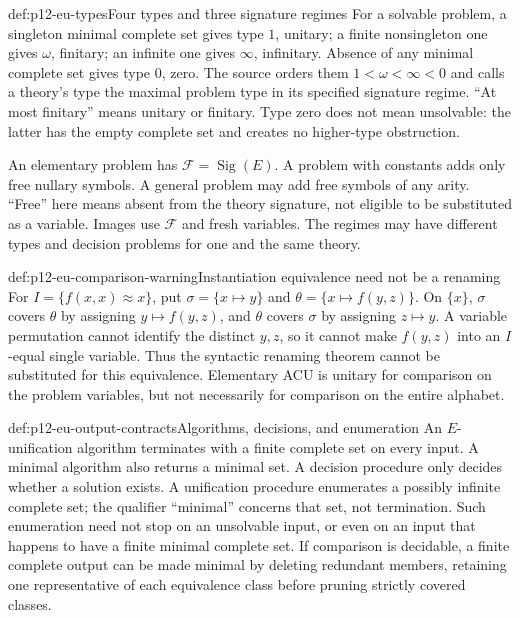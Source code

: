 \begin{hbdefinition}{def:p12-eu-types}{Four types and three signature regimes}
For a solvable problem, a singleton minimal complete set gives type
\(1\), unitary; a finite nonsingleton one gives \(\omega\), finitary;
an infinite one gives \(\infty\), infinitary. Absence of any minimal
complete set gives type \(0\), zero. The source orders them
\(1<\omega<\infty<0\) and calls a theory's type the maximal problem
type in its specified signature regime. ``At most finitary'' means
unitary or finitary. Type zero does not mean unsolvable: the latter
has the empty complete set and creates no higher-type obstruction.

An elementary problem has \(\mathcal F=\operatorname{Sig}(E)\).
A problem with constants adds only free nullary symbols. A general
problem may add free symbols of any arity. ``Free'' here means absent
from the theory signature, not eligible to be substituted as a variable.
Images use \(\mathcal F\) and fresh variables. The regimes may have
different types and decision problems for one and the same theory.
\cite[Definitions 3.4 and 3.9, pp.~471 and 474]{BaaderSnyder2001}
\end{hbdefinition}

\begin{hbexample}{def:p12-eu-comparison-warning}{Instantiation equivalence need not be a renaming}
For \(I=\{f(x,x)\approx x\}\), put
\(\sigma=\{x\mapsto y\}\) and \(\theta=\{x\mapsto f(y,z)\}\).
On \(\{x\}\), \(\sigma\) covers \(\theta\) by assigning
\(y\mapsto f(y,z)\), and \(\theta\) covers \(\sigma\) by assigning
\(z\mapsto y\). A variable permutation cannot identify the distinct
\(y,z\), so it cannot make \(f(y,z)\) into an \(I\)-equal single
variable. Thus the syntactic renaming theorem cannot be substituted for
this equivalence. Elementary ACU is unitary for comparison on the problem
variables, but not necessarily for comparison on the entire alphabet.
\cite[\S3.2.1, p.~473]{BaaderSnyder2001}
\end{hbexample}

\begin{hbmethod}{def:p12-eu-output-contracts}{Algorithms, decisions, and enumeration}
An \(E\)-unification algorithm terminates with a finite complete set on
every input. A minimal algorithm also returns a minimal set. A decision
procedure only decides whether a solution exists. A unification procedure
enumerates a possibly infinite complete set; the qualifier ``minimal''
concerns that set, not termination. Such enumeration need not stop on an
unsolvable input, or even on an input that happens to have a finite minimal
complete set. If comparison is decidable, a finite complete output can be
made minimal by deleting redundant members, retaining one representative
of each equivalence class before pruning strictly covered classes.
\cite[pp.~472--473]{BaaderSnyder2001}
\end{hbmethod}

